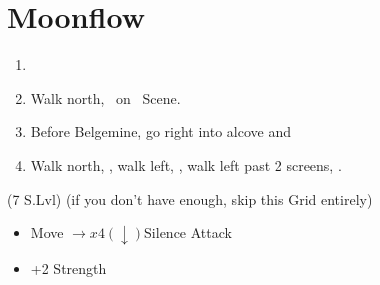 \chapter{Moonflow}

\begin{enumerate}
    \item \formation{\tidus}{\kimahri}{\auron}
    \item Walk north, \sd\ on \kimahri\ Scene.
    \item Before Belgemine, go right into alcove and 
    \item Walk north, \sd, walk left, \sd, walk left past 2 screens, \sd.
\end{enumerate}
\begin{spheregrid}
    \begin{itemize}
        \wakkaf (7 S.Lvl) (if you don't have enough, skip this Grid entirely)
        \begin{itemize}
            \item Move $\rightarrow x4 (\downarrow)$Silence Attack
            \item +2 Strength
        \end{itemize}
    \end{itemize}
\end{spheregrid}
